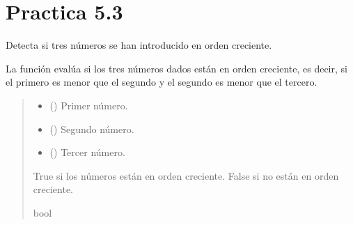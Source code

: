 \documentclass[letterpaper,10pt,spanish]{sphinxmanual}
\begin{document}
\section{Practica 5.3}
\label{\detokenize{pr5:module-pr5.3}}\label{\detokenize{pr5:practica-5-3}}

\begin{fulllineitems}
\label{\detokenize{pr5:pr5.3.deteccion}}
\pysigstartsignatures
{}
\pysigstopsignatures
\sphinxAtStartPar
Detecta si tres números se han introducido en orden creciente.

\sphinxAtStartPar
La función evalúa si los tres números dados están en orden creciente,
es decir, si el primero es menor que el segundo y el segundo es menor que el tercero.
\begin{quote}\begin{description}
\begin{itemize}
\item {} 
\sphinxAtStartPar
{} () \textendash{} Primer número.

\item {} 
\sphinxAtStartPar
{} () \textendash{} Segundo número.

\item {} 
\sphinxAtStartPar
{} () \textendash{} Tercer número.

\end{itemize}

\sphinxAtStartPar
True si los números están en orden creciente.
False si no están en orden creciente.

\sphinxAtStartPar
bool

\end{description}\end{quote}

\end{fulllineitems}
\end{document}
